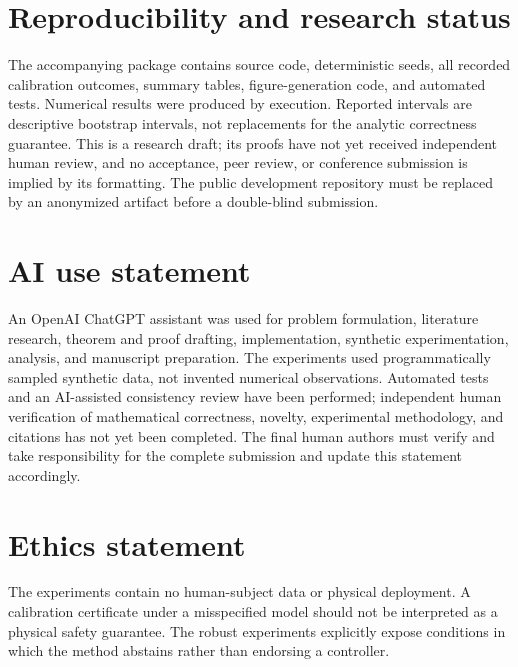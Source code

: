 \documentclass{article}
\begin{document}
\clearpage
\section*{Reproducibility and research status}
The accompanying package contains source code, deterministic seeds, all recorded calibration outcomes, summary tables, figure-generation code, and automated tests. Numerical results were produced by execution. Reported intervals are descriptive bootstrap intervals, not replacements for the analytic correctness guarantee. This is a research draft; its proofs have not yet received independent human review, and no acceptance, peer review, or conference submission is implied by its formatting. The public development repository must be replaced by an anonymized artifact before a double-blind submission.

\section*{AI use statement}
An OpenAI ChatGPT assistant was used for problem formulation, literature research, theorem and proof drafting, implementation, synthetic experimentation, analysis, and manuscript preparation. The experiments used programmatically sampled synthetic data, not invented numerical observations. Automated tests and an AI-assisted consistency review have been performed; independent human verification of mathematical correctness, novelty, experimental methodology, and citations has not yet been completed. The final human authors must verify and take responsibility for the complete submission and update this statement accordingly.

\section*{Ethics statement}
The experiments contain no human-subject data or physical deployment. A calibration certificate under a misspecified model should not be interpreted as a physical safety guarantee. The robust experiments explicitly expose conditions in which the method abstains rather than endorsing a controller.



\clearpage
\appendix


\end{document}
